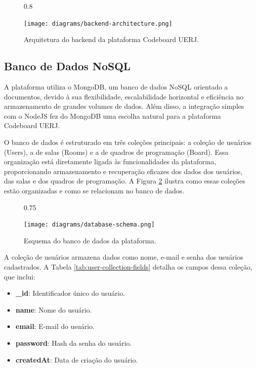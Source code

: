 \begin{figure}[H]{0.8\textwidth}
    \centering
    \caption{Arquitetura do backend da plataforma Codeboard UERJ.}
    \label{fig:backend-architecture}
    \texttt{[image: diagrams/backend-architecture.png]}
\end{figure}


\subsection{Banco de Dados NoSQL}

A plataforma utiliza o MongoDB, um banco de dados NoSQL orientado a documentos, devido à sua flexibilidade, escalabilidade horizontal e eficiência no armazenamento de grandes volumes de dados. Além disso, a integração simples com o NodeJS fez do MongoDB uma escolha natural para a plataforma Codeboard UERJ.

O banco de dados é estruturado em três coleções principais: a coleção de usuários (Users), a de salas (Rooms) e a de quadros de programação (Board). Essa organização está diretamente ligada às funcionalidades da plataforma, proporcionando armazenamento e recuperação eficazes dos dados dos usuários, das salas e dos quadros de programação. A Figura \ref{fig:database-schema} ilustra como essas coleções estão organizadas e como se relacionam no banco de dados.

\begin{figure}[H]{0.75\textwidth}
    \centering
    \caption{Esquema do banco de dados da plataforma.}
    \label{fig:database-schema}
    \texttt{[image: diagrams/database-schema.png]}
\end{figure}

A coleção de usuários armazena dados como nome, e-mail e senha dos usuários cadastrados. A Tabela \ref{tab:user-collection-fields} detalha os campos dessa coleção, que inclui:

\begin{itemize}
    \item \textbf{\_id}: Identificador único do usuário.
    \item \textbf{name}: Nome do usuário.
    \item \textbf{email}: E-mail do usuário.
    \item \textbf{password}: Hash da senha do usuário.
    \item \textbf{createdAt}: Data de criação do usuário.
\end{itemize}

